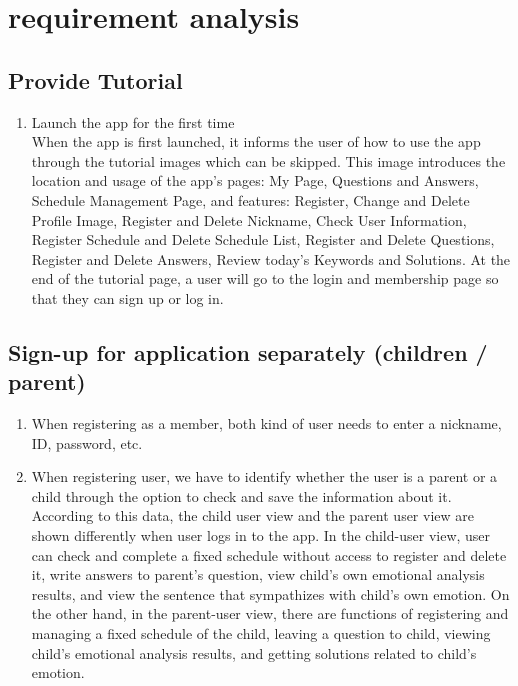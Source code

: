 \documentclass[conference]{IEEEtran}
\begin{document}
\section{\large{requirement analysis}}

\subsection{Provide Tutorial}
\begin{enumerate}
  \item Launch the app for the first time \\
    When the app is first launched, it informs the user of how to use the app through the tutorial images which can be skipped. This image introduces the location and usage of the app's pages: My Page, Questions and Answers, Schedule Management Page, and features: Register, Change and Delete Profile Image, Register and Delete Nickname, Check User Information, Register Schedule and Delete Schedule List, Register and Delete Questions, Register and Delete Answers, Review today's Keywords and Solutions. At the end of the tutorial page, a user will go to the login and membership page so that they can sign up or log in.
  
\end{enumerate}

\subsection{Sign-up for application separately (children / parent)}

\begin{enumerate}
  \item When registering as a member, both kind of user needs to enter a nickname, ID, password, etc.
  
  \item When registering user, we have to identify whether the user is a parent or a child through the option to check and save the information about it. According to this data, the child user view and the parent user view are shown differently when user logs in to the app. In the child-user view, user can check and complete a fixed schedule without access to register and delete it, write answers to parent’s question, view child’s own emotional analysis results, and view the sentence that sympathizes with child's own emotion. On the other hand, in the parent-user view, there are functions of registering and managing a fixed schedule of the child, leaving a question to child, viewing child's emotional analysis results, and getting solutions related to child’s emotion.
\end{enumerate}
\end{document}
